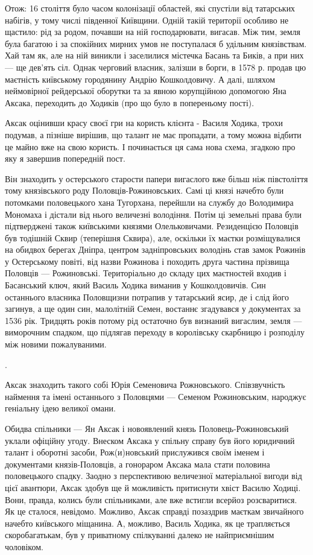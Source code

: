
Отож: 16 століття було часом колонізації областей, які спустіли від татарських
набігів, у тому числі південної Київщини. Одній такій території особливо не
щастило: рід за родом, почавши на ній господарювати, вигасав. Між тим, земля
була багатою і за спокійних мирних умов не поступалася б удільним князівствам.
Хай там як, але на ній виникли і заселилися містечка Басань та Биків, а при них
— ще дев’ять сіл. Однак черговий власник, залізши в борги, в 1578 р. продав цю
маєтність київському городянину Андрію Кошколдовичу. А далі, шляхом неймовірної
рейдерської оборутки та за явною корупційною допомогою Яна Аксака, переходить
до Ходиків (про що було в попереньому пості).

Аксак оцінивши красу своєї гри на користь клієнта - Василя Ходика, трохи
подумав, а пізніше вирішив, що талант не має пропадати, а тому можна відбити це
майно вже на свою користь. І починається ця сама нова схема, згадкою про яку я
завершив попередній пост.

Він знаходить у остерського старости папери вигаслого вже більш ніж півстоліття
тому князівського роду Половців-Рожиновських. Самі ці князі начебто були
потомками половецького хана Тугорхана, перейшли на службу до Володимира
Мономаха і дістали від нього величезні володіння. Потім ці земельні права були
підтверджені також київськими князями Олельковичами. Резиденцією Половців був
тодішній Сквир (теперішня Сквира), але, оскільки їх маєтки розміщувалися на
обидвох берегах Дніпра, центром задніпровських володінь став замок Рожинів у
Остерському повіті, від назви Рожинова і походить друга частина прізвища
Половців — Рожиновські. Територіально до складу цих маєтностей входив і
Басанський ключ, який Василь Ходика виманив у Кошколдовичів. Син останнього
власника Половщизни потрапив у татарський ясир, де і слід його загинув, а ще
один син, малолітній Семен, востаннє згадувався у документах за 1536 рік.
Тридцять років потому рід остаточно був визнаний вигаслим, земля — виморочним
спадком, що підлягав переходу в королівську скарбницю і розподілу між новими
пожалуваними. 

.

Аксак знаходить такого собі Юрія Семеновича Рожновського. Співзвучність
наймення та імені останнього з Половцями — Семеном Рожиновським, народжує
геніальну ідею великої омани. 

Обидва спільники — Ян Аксак і новоявлений князь Половець-Рожиновський уклали
офіційну угоду. Внеском Аксака у спільну справу був його юридичний талант і
оборотні засоби, Рож(и)новський прислужився своїм іменем і документами
князів-Половців, а гонораром Аксака мала стати половина половецького спадку.
Заодно з перспективою величезної матеріальної вигоди від цієї авантюри, Аксак
здобув ще й можливість притиснути хвіст Василю Ходиці. Вони, правда, колись
були спільниками, але вже встигли всерйоз розсваритися. Як це сталося,
невідомо. Можливо, Аксак справді позаздрив маєткам звичайного начебто
київського міщанина. А, можливо, Василь Ходика, як це трапляється
скоробагатькам, був у приватному спілкуванні далеко не найприємнішим чоловіком.

